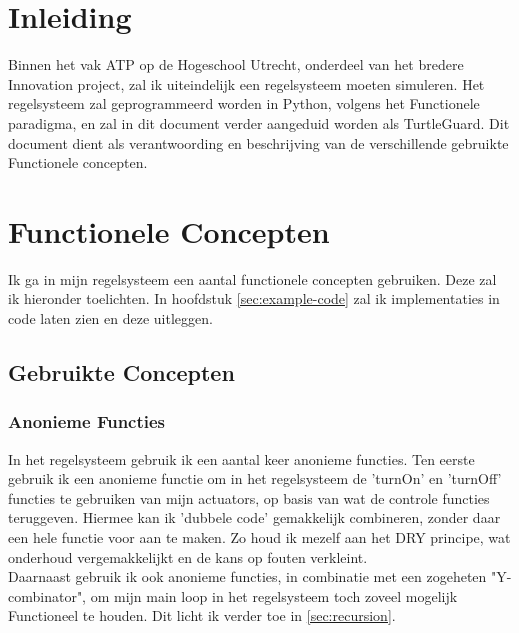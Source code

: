 \documentclass[a4paper]{report}
\newcommand{\turtleguard}{\mbox{TurtleGuard\texttrademark}\xspace}
\begin{document}
\tableofcontents


\clearpage  %

\chapter{Inleiding}
Binnen het vak ATP op de Hogeschool Utrecht, onderdeel van het bredere Innovation project, zal ik uiteindelijk een regelsysteem moeten simuleren.
Het regelsysteem zal geprogrammeerd worden in Python, volgens het Functionele paradigma, en zal in dit document verder aangeduid worden als \turtleguard.
Dit document dient als verantwoording en beschrijving van de verschillende gebruikte Functionele concepten. 

\chapter{Functionele Concepten}
Ik ga in mijn regelsysteem een aantal functionele concepten gebruiken. Deze zal ik hieronder toelichten.
In hoofdstuk \ref{sec:example-code} zal ik implementaties in code laten zien en deze uitleggen.
\section{Gebruikte Concepten}
\subsection{Anonieme Functies}
In het regelsysteem gebruik ik een aantal keer anonieme functies.
Ten eerste gebruik ik een anonieme functie om in het regelsysteem de 'turnOn' en 'turnOff' functies te gebruiken van mijn actuators, op basis van wat de controle functies teruggeven.
Hiermee kan ik 'dubbele code' gemakkelijk combineren, zonder daar een hele functie voor aan te maken. Zo houd ik mezelf aan het DRY principe, wat onderhoud vergemakkelijkt en de kans op fouten verkleint.
\\
Daarnaast gebruik ik ook anonieme functies, in combinatie met een zogeheten "Y-combinator", om mijn main loop in het regelsysteem toch zoveel mogelijk Functioneel te houden.
Dit licht ik verder toe in \ref{sec:recursion}. 
\end{document}
